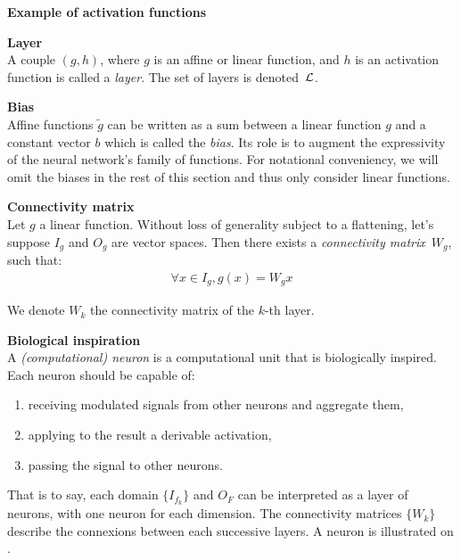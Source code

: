 \begin{remark}\textbf{Example of activation functions}\\
\end{remark}

\begin{definition}\textbf{Layer}\\
A couple $(g,h)$, where $g$ is an affine or linear function, and $h$ is an activation function is called a \emph{layer}. The set of layers is denoted~$\mathcal{L}$.
\end{definition}

\begin{remark}\textbf{Bias}\\
Affine functions $\widetilde{g}$ can be written as a sum between a linear function $g$ and a constant vector $b$ which is called the \emph{bias}. Its role is to augment the expressivity of the neural network's family of functions. For notational conveniency, we will omit the biases in the rest of this section and thus only consider linear functions.
\end{remark}

\begin{definition}\textbf{Connectivity matrix}\\
Let $g$ a linear function. Without loss of generality subject to a flattening, let's suppose $I_g$ and $O_g$ are vector spaces. Then there exists a \emph{connectivity matrix}~$W_g$, such that:
\begin{gather*}
\forall x \in I_g, g(x) = W_g x
\end{gather*}
\end{definition}
We denote $W_k$ the connectivity matrix of the $k$-th layer.

\begin{remark}\textbf{Biological inspiration}\\
A \emph{(computational) neuron} is a computational unit that is biologically inspired. Each neuron should be capable of:
\begin{enumerate}
\item receiving modulated signals from other neurons and aggregate them,
\item applying to the result a derivable activation,
\item passing the signal to other neurons.
\end{enumerate}
That is to say, each domain $\{I_{f_k}\}$ and $O_F$ can be interpreted as a layer of neurons, with one neuron for each dimension. The connectivity matrices $\{W_k\}$ describe the connexions between each successive layers.
A neuron is illustrated on .
\end{remark}

